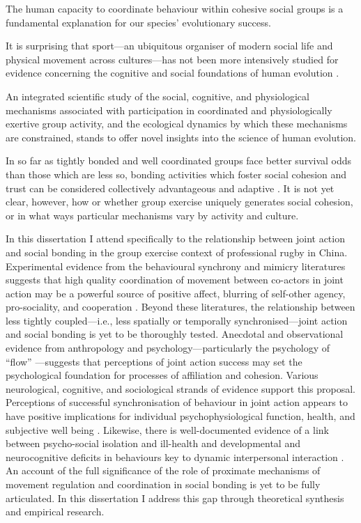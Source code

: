 \begin{CJK}{UTF8}{gbsn}
The human capacity to coordinate behaviour within cohesive social groups is a fundamental explanation for our species' evolutionary success.

It is surprising that sport---an ubiquitous organiser of modern social life and physical movement across cultures---has not been more intensively studied for evidence concerning the cognitive and social foundations of human evolution \citep{Blanchard1995,Downey2005a}.

An integrated scientific study of the social, cognitive, and physiological mechanisms associated with participation in coordinated and physiologically exertive group activity, and the ecological dynamics by which these mechanisms are constrained, stands to offer novel insights into the science of human evolution.

 In so far as tightly bonded and well coordinated groups face better survival odds than those which are less so, bonding activities which foster social cohesion and trust can be considered collectively advantageous and adaptive \citep{Dunbar2010}.  It is not yet clear, however, how or whether group exercise uniquely generates social cohesion, or in what ways particular mechanisms vary by activity and culture.

In this dissertation I attend specifically to the relationship between joint action and social bonding in the group exercise context of professional rugby in China.  Experimental evidence from the behavioural synchrony and mimicry literatures suggests that high quality coordination of movement between co-actors in joint action may be a powerful source of positive affect, blurring of self-other agency, pro-sociality, and cooperation \citep{Mogan2017}.  Beyond these literatures, the relationship between less tightly coupled---i.e., less spatially or temporally synchronised---joint action and social bonding is yet to be thoroughly tested. Anecdotal and observational evidence from anthropology and psychology---particularly the psychology of ``flow'' \citep{Csikszentmihalyi1992,Jackson1999}---suggests that perceptions of joint action success may set the psychological foundation for processes of affiliation and cohesion.  Various neurological, cognitive, and sociological strands of evidence support this proposal.  Perceptions of successful synchronisation of behaviour in joint action appears to have positive implications for individual psychophysiological function, health, and subjective well being \citep{Wheatley2012}.  Likewise, there is well-documented evidence of a link between psycho-social isolation and ill-health and developmental and neurocognitive deficits in behaviours key to dynamic interpersonal interaction \citep[e.g.][]{Blakemore2005,Baron-Cohen1991}. An account of the full significance of the role of proximate mechanisms of movement regulation and coordination in social bonding is yet to be fully articulated. In this dissertation I address this gap through theoretical synthesis and empirical research.




\end{CJK}
